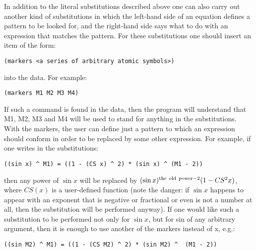 In addition  to  the  literal  substitutions  described
     above  one can also carry out another kind of substitutions in
     which the left-hand side of an equation defines a pattern to
     be  looked for, and the right-hand side says what to do with
an expression that matches the pattern. For these  substitutions one should
insert an item of the form:

\bigskip

\begin{verbatim}
(markers <a series of arbitrary atomic symbols>)
\end{verbatim}

\bigskip

\noindent into the data. For example:

\bigskip

\begin{verbatim}
(markers M1 M2 M3 M4)
\end{verbatim}

\bigskip

\noindent If such a command is found in the  data,  then  the program
     will understand that M1, M2, M3 and M4 will be used to stand
     for anything in the substitutions. With the markers,  the  user
can define just a pattern to which an expression should conform in order to be
replaced by some other  expression.  For
     example, if one writes in the substitutions:

\bigskip

\begin{verbatim}
((sin x) ^ M1) = ((1 - (CS x) ^ 2) * (sin x) ^ (M1 - 2))
\end{verbatim}

\bigskip

\noindent then any power of $\sin x$ will be replaced by $(\sin x)^{{\rm the \
old \ power} - 2}(1 - CS^2 x)$, where $CS(x)$ is a user-defined function (note
the danger:  if $\sin x$ happens to appear with an exponent that is negative or
fractional or even is not a number at all, then the  substitution  will  be
performed anyway). If one would like such a
     substitution to be performed not only for $\sin x$, but for sin
     of  any arbitrary argument, then it is enough to use another
     of the markers instead of x, e.g.:

\bigskip

\begin{verbatim}
((sin M2) ^ M1) = ((1 - (CS M2) ^ 2) * (sin M2) ^  (M1 - 2))
\end{verbatim}

